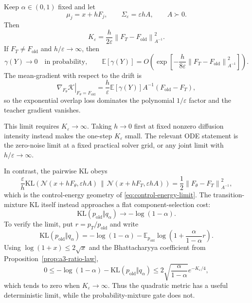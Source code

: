 \documentclass[11pt,a4paper]{article}
\newcommand{\E}{\mathbb{E}}
\newcommand{\N}{\mathcal{N}}
\newcommand{\KL}{\mathrm{KL}}
\newcommand{\norm}[1]{\left\lVert #1 \right\rVert}
\theoremstyle{plain}
\theoremstyle{definition}
\begin{document}
Keep $\alpha\in(0,1)$ fixed and let
\begin{equation}
\mu_j=x+hF_j,
\qquad
\Sigma_\varepsilon=\varepsilon hA,
\qquad
A\succ0 .
\label{eq:a3-euler-sde}
\end{equation}
Then
\begin{equation}
K_\varepsilon
=
\frac{h}{2\varepsilon}
\norm{F_T-F_{\mathrm{old}}}_{A^{-1}}^2.
\label{eq:a3-small-noise-K}
\end{equation}
If $F_T\neq F_{\mathrm{old}}$ and $h/\varepsilon\to\infty$, then
\begin{equation}
\gamma(Y)\to0
\quad\text{in probability},\qquad
\E[\gamma(Y)]
=
O\!\left(
  \exp\!\left[
    -\frac{h}{8\varepsilon}
    \norm{F_T-F_{\mathrm{old}}}_{A^{-1}}^2
  \right]
\right).
\label{eq:a3-small-noise-collapse}
\end{equation}
The mean-gradient with respect to the drift is
\begin{equation}
\left.
\nabla_{F_\theta}\mathcal K
\right|_{F_\theta=F_{\mathrm{old}}}
=
\frac{h}{\varepsilon}\E[\gamma(Y)]
A^{-1}(F_{\mathrm{old}}-F_T),
\label{eq:a3-drift-gradient}
\end{equation}
so the exponential overlap loss dominates the polynomial $1/\varepsilon$ factor and the teacher
gradient vanishes.

This limit requires $K_\varepsilon\to\infty$.  Taking $h\to0$ first at fixed nonzero diffusion
intensity instead makes the one-step $K_\varepsilon$ small.  The relevant ODE statement is the
zero-noise limit at a fixed practical solver grid, or any joint limit with $h/\varepsilon\to\infty$.

In contrast, the pairwise KL obeys
\begin{equation}
\frac{\varepsilon}{h}
\KL\!\left(
  \N(x+hF_\theta,\varepsilon hA)
  \,\middle\Vert\,
  \N(x+hF_T,\varepsilon hA)
\right)
=
\frac12\norm{F_\theta-F_T}_{A^{-1}}^2,
\label{eq:a3-pairwise-control}
\end{equation}
which is the control-energy geometry of \eqref{eq:control-energy-limit}.  The transition-mixture
KL itself instead approaches a flat component-selection cost:
\begin{equation}
\KL(p_{\mathrm{old}}\Vert q_\alpha)
\longrightarrow
-\log(1-\alpha).
\label{eq:a3-mixture-flat-limit}
\end{equation}
To verify the limit, put $r=p_T/p_{\mathrm{old}}$ and write
\begin{equation}
\KL(p_{\mathrm{old}}\Vert q_\alpha)
=
-\log(1-\alpha)
-\E_{p_{\mathrm{old}}}
\log\!\left(
  1+\frac{\alpha}{1-\alpha}r
\right).
\label{eq:a3-mixture-limit-expansion}
\end{equation}
Using $\log(1+x)\le2\sqrt{x}$ and the Bhattacharyya coefficient from
Proposition~\ref{prop:a3-ratio-law},
\begin{equation}
0
\le
-\log(1-\alpha)
-\KL(p_{\mathrm{old}}\Vert q_\alpha)
\le
2\sqrt{\frac{\alpha}{1-\alpha}}e^{-K_\varepsilon/4},
\label{eq:a3-mixture-limit-bound}
\end{equation}
which tends to zero when $K_\varepsilon\to\infty$.
Thus the quadratic metric has a useful deterministic limit, while the probability-mixture gate
does not.
\end{document}
